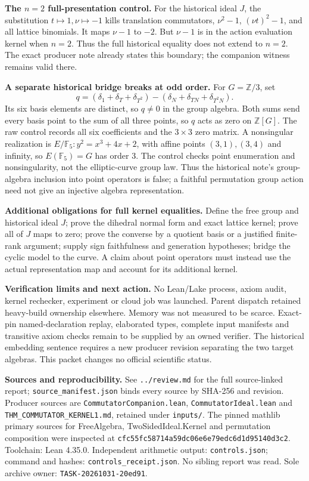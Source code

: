 \documentclass[10pt]{article}
\begin{document}
\textbf{The $n=2$ full-presentation control.} For the historical ideal $J$, the substitution $t\mapsto1,\nu\mapsto-1$ kills translation commutators, $\nu^2-1$, $(\nu t)^2-1$, and all lattice binomials. It maps $\nu-1$ to $-2$. But $\nu-1$ is in the action evaluation kernel when $n=2$. Thus the full historical equality does not extend to $n=2$. The exact producer note already states this boundary; the companion witness remains valid there.

\textbf{A separate historical bridge breaks at odd order.} For $G=\mathbb Z/3$, set
\[
q=(\delta_1+\delta_T+\delta_{T^2})-(\delta_N+\delta_{TN}+\delta_{T^2N}).
\]
Its six basis elements are distinct, so $q\ne0$ in the group algebra. Both sums send every basis point to the sum of all three points, so $q$ acts as zero on $\mathbb Z[G]$. The raw control records all six coefficients and the $3\times3$ zero matrix. A nonsingular realization is $E/\mathbb F_5:y^2=x^3+4x+2$, with affine points $(3,1),(3,4)$ and infinity, so $E(\mathbb F_5)=G$ has order 3. The control checks point enumeration and nonsingularity, not the elliptic-curve group law. Thus the historical note's group-algebra inclusion into point operators is false; a faithful permutation group action need not give an injective algebra representation.

\textbf{Additional obligations for full kernel equalities.} Define the free group and historical ideal $J$; prove the dihedral normal form and exact lattice kernel; prove all of $J$ maps to zero; prove the converse by a quotient basis or a justified finite-rank argument; supply sign faithfulness and generation hypotheses; bridge the cyclic model to the curve. A claim about point operators must instead use the actual representation map and account for its additional kernel.

\textbf{Verification limits and next action.} No Lean/Lake process, axiom audit, kernel rechecker, experiment or cloud job was launched. Parent dispatch retained heavy-build ownership elsewhere. Memory was not measured to be scarce. Exact-pin named-declaration replay, elaborated types, complete input manifests and transitive axiom checks remain to be supplied by an owned verifier. The historical embedding sentence requires a new producer revision separating the two target algebras. This packet changes no official scientific status.

\begin{flushleft}\small
\textbf{Sources and reproducibility.} See \texttt{../review.md} for the full source-linked report; \texttt{source\_manifest.json} binds every source by SHA-256 and revision. Producer sources are \texttt{CommutatorCompanion.lean}, \texttt{CommutatorIdeal.lean} and \texttt{THM\_COMMUTATOR\_KERNEL1.md}, retained under \texttt{inputs/}. The pinned mathlib primary sources for FreeAlgebra, TwoSidedIdeal.Kernel and permutation composition were inspected at \texttt{cfc55fc58714a59dc06e6e79edc6d1d95140d3c2}. Toolchain: Lean 4.35.0. Independent arithmetic output: \texttt{controls.json}; command and hashes: \texttt{controls\_receipt.json}. No sibling report was read. Sole archive owner: \texttt{TASK-20261031-20ed91}.
\end{flushleft}
\end{document}
